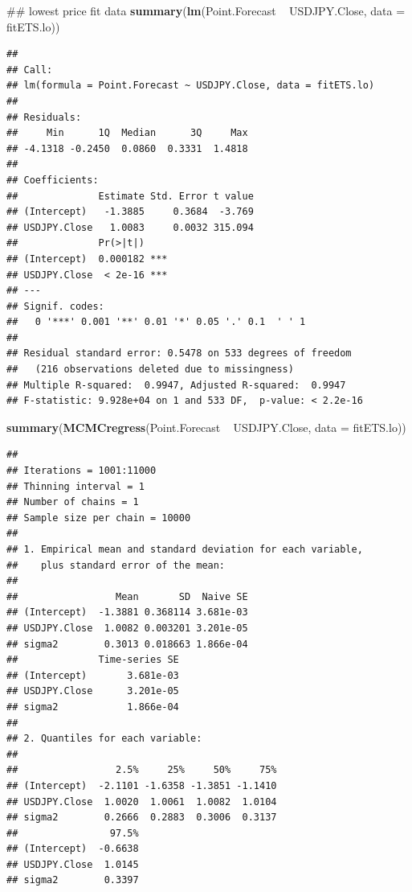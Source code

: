 \documentclass[]{tufte-book}
\newenvironment{Shaded}{}{}
\newcommand{\KeywordTok}[1]{\textcolor[rgb]{0.00,0.44,0.13}{\textbf{#1}}}
\newcommand{\DataTypeTok}[1]{\textcolor[rgb]{0.56,0.13,0.00}{#1}}
\newcommand{\StringTok}[1]{\textcolor[rgb]{0.25,0.44,0.63}{#1}}
\newcommand{\OperatorTok}[1]{\textcolor[rgb]{0.40,0.40,0.40}{#1}}
\newcommand{\NormalTok}[1]{#1}
\begin{document}
\begin{Shaded}
\begin{Highlighting}[]
\NormalTok{## lowest price fit data}
\KeywordTok{summary}\NormalTok{(}\KeywordTok{lm}\NormalTok{(Point.Forecast }\OperatorTok{~}\StringTok{ }\NormalTok{USDJPY.Close, }\DataTypeTok{data =}\NormalTok{ fitETS.lo))}
\end{Highlighting}
\end{Shaded}

\begin{verbatim}
## 
## Call:
## lm(formula = Point.Forecast ~ USDJPY.Close, data = fitETS.lo)
## 
## Residuals:
##     Min      1Q  Median      3Q     Max 
## -4.1318 -0.2450  0.0860  0.3331  1.4818 
## 
## Coefficients:
##              Estimate Std. Error t value
## (Intercept)   -1.3885     0.3684  -3.769
## USDJPY.Close   1.0083     0.0032 315.094
##              Pr(>|t|)    
## (Intercept)  0.000182 ***
## USDJPY.Close  < 2e-16 ***
## ---
## Signif. codes:  
##   0 '***' 0.001 '**' 0.01 '*' 0.05 '.' 0.1  ' ' 1
## 
## Residual standard error: 0.5478 on 533 degrees of freedom
##   (216 observations deleted due to missingness)
## Multiple R-squared:  0.9947, Adjusted R-squared:  0.9947 
## F-statistic: 9.928e+04 on 1 and 533 DF,  p-value: < 2.2e-16
\end{verbatim}

\begin{Shaded}
\begin{Highlighting}[]
\KeywordTok{summary}\NormalTok{(}\KeywordTok{MCMCregress}\NormalTok{(Point.Forecast }\OperatorTok{~}\StringTok{ }\NormalTok{USDJPY.Close, }
    \DataTypeTok{data =}\NormalTok{ fitETS.lo))}
\end{Highlighting}
\end{Shaded}

\begin{verbatim}
## 
## Iterations = 1001:11000
## Thinning interval = 1 
## Number of chains = 1 
## Sample size per chain = 10000 
## 
## 1. Empirical mean and standard deviation for each variable,
##    plus standard error of the mean:
## 
##                 Mean       SD  Naive SE
## (Intercept)  -1.3881 0.368114 3.681e-03
## USDJPY.Close  1.0082 0.003201 3.201e-05
## sigma2        0.3013 0.018663 1.866e-04
##              Time-series SE
## (Intercept)       3.681e-03
## USDJPY.Close      3.201e-05
## sigma2            1.866e-04
## 
## 2. Quantiles for each variable:
## 
##                 2.5%     25%     50%     75%
## (Intercept)  -2.1101 -1.6358 -1.3851 -1.1410
## USDJPY.Close  1.0020  1.0061  1.0082  1.0104
## sigma2        0.2666  0.2883  0.3006  0.3137
##                97.5%
## (Intercept)  -0.6638
## USDJPY.Close  1.0145
## sigma2        0.3397
\end{verbatim}
\end{document}
